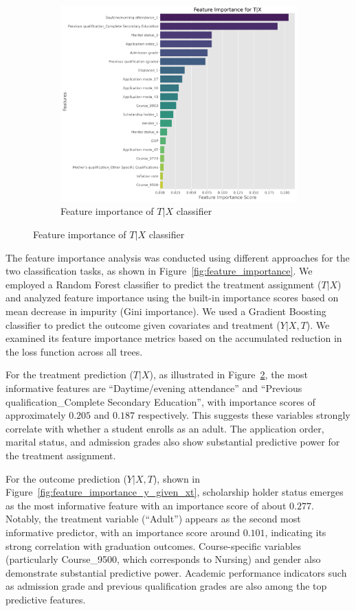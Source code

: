 \documentclass{article}
\begin{document}
\begin{figure}
\begin{subfigure}[b]{0.45\textwidth}
        \includegraphics[width=\textwidth]{plots/feature_importance_t_given_x.png}
        \caption{Feature importance of $T | X$ classifier}
        \label{fig:feature_importance_t_given_x}
    \end{subfigure}
\end{figure}

The feature importance analysis was conducted using different approaches for the two classification tasks, as shown in Figure~\ref{fig:feature_importance}. We employed a Random Forest classifier to predict the treatment assignment ($T|X$) and analyzed feature importance using the built-in importance scores based on mean decrease in impurity (Gini importance). We used a Gradient Boosting classifier to predict the outcome given covariates and treatment ($Y|X, T$). We examined its feature importance metrics based on the accumulated reduction in the loss function across all trees.

For the treatment prediction ($T|X$), as illustrated in Figure~\ref{fig:feature_importance_t_given_x}, the most informative features are ``Daytime/evening attendance'' and ``Previous qualification\_Complete Secondary Education'', with importance scores of approximately $0.205$ and $0.187$ respectively. This suggests these variables strongly correlate with whether a student enrolls as an adult. The application order, marital status, and admission grades also show substantial predictive power for the treatment assignment.

For the outcome prediction ($Y|X, T$), shown in Figure~\ref{fig:feature_importance_y_given_xt}, scholarship holder status emerges as the most informative feature with an importance score of about $0.277$. Notably, the treatment variable (``Adult'') appears as the second most informative predictor, with an importance score around $0.101$, indicating its strong correlation with graduation outcomes. Course-specific variables (particularly Course\_9500, which corresponds to Nursing) and gender also demonstrate substantial predictive power. Academic performance indicators such as admission grade and previous qualification grades are also among the top predictive features.
\end{document}

